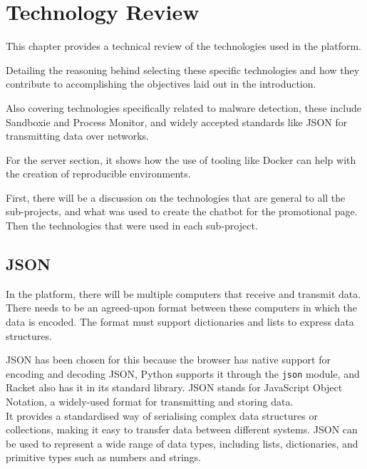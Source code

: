 \chapter{Technology Review}

This chapter provides a technical review of the technologies used in the platform.

Detailing the reasoning behind selecting these specific technologies
and how they contribute to accomplishing the objectives laid out in the introduction.

Also covering technologies specifically related to malware detection,
these include Sandboxie and Process Monitor,
and widely accepted standards like JSON for transmitting data over networks.

For the server section, it shows how the use of tooling like Docker
can help with the creation of reproducible environments.

First, there will be a discussion on the technologies that are general
to all the sub-projects,
and what was used to create the chatbot for the promotional page.
Then the technologies that were used in each sub-project.

\section{JSON}
In the platform, there will be multiple computers that receive and transmit data.
There needs to be an agreed-upon format between these
computers in which the data is encoded.
The format must support dictionaries and lists to express data structures.

JSON has been chosen for this because the browser has
native support for encoding and decoding JSON,
Python supports it through the \texttt{json} module,
and Racket also has it in its standard library.
JSON stands for JavaScript Object Notation,
a widely-used format for transmitting and storing data. \\

It provides a standardised way of serialising complex data structures or collections,
making it easy to transfer data between different systems.
JSON can be used to represent a wide range of data types,
including lists, dictionaries, and primitive types such as numbers and strings. \cite{ECMA-404}

